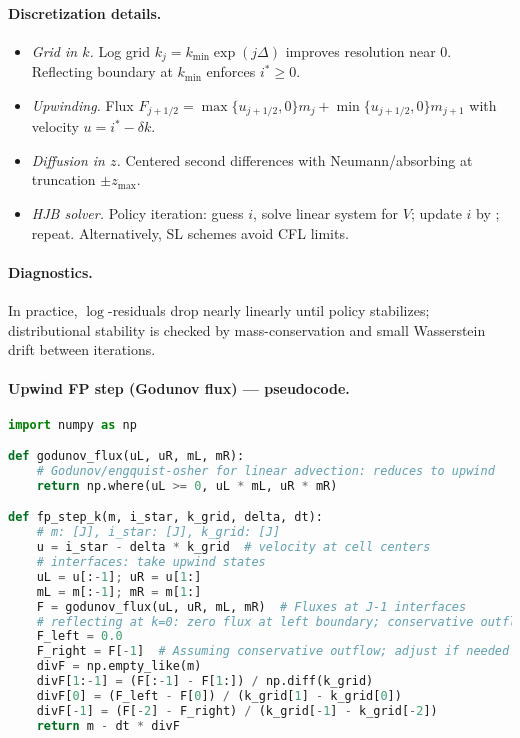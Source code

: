 ﻿\documentclass[11pt,letterpaper,oneside]{article}
\numberwithin{equation}{section}
\newcommand{\ac}[1]{{\mdseries\textsc{#1}}}
\newcommand{\1}{\mathbf{1}}
\begin{document}
\begin{tcolorbox}[didacticstyle]
\begin{itemize}[leftmargin=1.1em,itemsep=0.25em]
\paragraph{Discretization details.}
\begin{itemize}[leftmargin=1.25em]
\item \emph{Grid in $k$.} Log grid $k_j=k_{\min}\exp(j\Delta)$ improves resolution near $0$. Reflecting boundary at $k_{\min}$ enforces $i^*\!\ge 0$.
\item \emph{Upwinding.} Flux $F_{j+1/2}=\max\{u_{j+1/2},0\}m_j+\min\{u_{j+1/2},0\}m_{j+1}$ with velocity $u=i^*-\delta k$.
\item \emph{Diffusion in $z$.} Centered second differences with Neumann/absorbing at truncation $\pm z_{\max}$.
\item \emph{HJB solver.} Policy iteration: guess $i$, solve linear system for $V$; update $i$ by ; repeat. Alternatively, \ac{SL} schemes avoid CFL limits.
\end{itemize}

\paragraph{Diagnostics.} In practice, $\log$-residuals drop nearly linearly until policy stabilizes; distributional stability is checked by mass-conservation and small Wasserstein drift between iterations.

\paragraph{Upwind FP step (Godunov flux) --- pseudocode.}
\begin{lstlisting}[language=Python,caption={1D upwind FV update for k-transport (reflecting at k=0)}]
import numpy as np

def godunov_flux(uL, uR, mL, mR):
    # Godunov/engquist-osher for linear advection: reduces to upwind
    return np.where(uL >= 0, uL * mL, uR * mR)

def fp_step_k(m, i_star, k_grid, delta, dt):
    # m: [J], i_star: [J], k_grid: [J]
    u = i_star - delta * k_grid  # velocity at cell centers
    # interfaces: take upwind states
    uL = u[:-1]; uR = u[1:]
    mL = m[:-1]; mR = m[1:]
    F = godunov_flux(uL, uR, mL, mR)  # Fluxes at J-1 interfaces
    # reflecting at k=0: zero flux at left boundary; conservative outflow at right
    F_left = 0.0
    F_right = F[-1]  # Assuming conservative outflow; adjust if needed
    divF = np.empty_like(m)
    divF[1:-1] = (F[:-1] - F[1:]) / np.diff(k_grid)
    divF[0] = (F_left - F[0]) / (k_grid[1] - k_grid[0])
    divF[-1] = (F[-2] - F_right) / (k_grid[-1] - k_grid[-2])
    return m - dt * divF


\end{lstlisting}
\end{itemize}
\end{tcolorbox}
\end{document}
